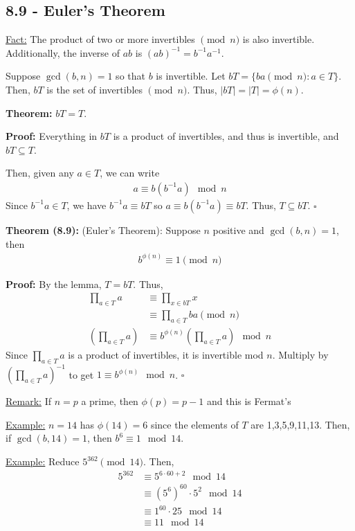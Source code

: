 \documentclass{article}
\newcommand*{\qed}{\hfill$\square$}%
\begin{document}
\subsection{8.9 - Euler's Theorem}

\underline{Fact:} The product of two or more invertibles $\pmod n$ is also invertible. Additionally, the inverse of $ab$ is $(ab)^{-1}=b^{-1}a^{-1}$. 

Suppose $\gcd(b,n)=1$ so that $b$ is invertible. Let $bT=\{b a\pmod n: a\in T\}$. Then, $bT$ is the set of invertibles $\pmod n$. Thus, $|bT|=|T|=\phi(n)$.

\textbf{Theorem:} $bT=T$. 

\textbf{Proof:} Everything in $bT$ is a product of invertibles, and thus is invertible, and $bT\subseteq T$. 

Then, given any $a\in T$, we can write \begin{align*}
    a\equiv b(b^{-1}a)\mod n
\end{align*}Since $b^{-1}a\in T$, we have $b^{-1}a\equiv bT$ so $a\equiv b(b^{-1}a)\equiv bT$. Thus, $T\subseteq bT$. \qed

\textbf{Theorem (8.9):} (Euler's Theorem): Suppose $n$ positive and $\gcd(b,n)=1$, then \begin{align*}
    b^{\phi(n)}\equiv 1\pmod n
\end{align*}

\textbf{Proof:} By the lemma, $T=bT$. Thus, \begin{align*}
    \prod_{a\in T}a&\equiv\prod_{x\in bT}x\\
    &\equiv \prod_{a\in T}ba\pmod n\\
    (\prod_{a\in T}a)&\equiv b^{\phi(n)}(\prod_{a\in T}a)\mod n
\end{align*}Since $\prod_{a\in T}a$ is a product of invertibles, it is invertible mod $n$. Multiply by $(\prod_{a\in T}a)^{-1}$ to get $1\equiv b^{\phi(n)}\mod n$. \qed

\underline{Remark:} If $n=p$ a prime, then $\phi(p)=p-1$ and this is Fermat's

\underline{Example:} $n=14$ has $\phi(14)=6$ since the elements of $T$ are 1,3,5,9,11,13. Then, if $\gcd(b,14)=1$, then $b^6\equiv 1\mod 14$.

\underline{Example:} Reduce $5^{362}\pmod{14}$. Then, \begin{align*}
    5^{362}&\equiv 5^{6\cdot 60+2}\mod 14\\
    &\equiv (5^6)^{60}\cdot 5^2\mod 14\\
    &\equiv 1^{60}\cdot 25\mod 14\\
    &\equiv 11\mod 14
\end{align*}
\end{document}
